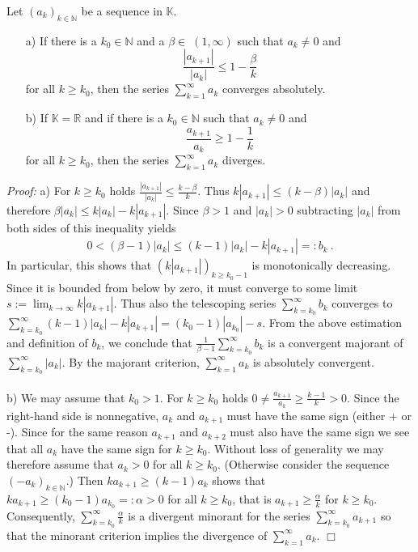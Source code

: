 \begin{Theorem} \label{th:raabecrit}
Let $(a_k)_{k\in\mathbb{N}}$ be  a sequence in $\mathbb{K}$.
\begin{itemize}
 \item[a)] If there is a $k_0\in\mathbb{N}$ and a $\beta\in\;(1,\infty)$ such that $a_k\neq 0$ and 
          $$\frac{|a_{k+1}|}{|a_k|} \leq 1-\frac{\beta}{k}$$ for all $k\geq k_0$, 
          then the series $\sum_{k=1}^{\infty}a_k$ converges absolutely.
 \item[b)] If $\mathbb{K}=\mathbb{R}$ and if there is a $k_0\in\mathbb{N}$ such that $a_k\neq 0$ and 
           $$\frac{a_{k+1}}{a_k} \geq 1-\frac{1}{k}$$ for all $k\geq k_0$, 
           then the series $\sum_{k=1}^{\infty}a_k$ diverges.
\end{itemize}
\end{Theorem}
{\em Proof:}
  a) For $k\geq k_0$ holds $\frac{|a_{k+1}|}{|a_k|} \leq \frac{k-\beta}{k}$. Thus 
     $k|a_{k+1}|\leq (k-\beta)|a_k|$ and therefore $\beta|a_k|\leq k |a_k|-k|a_{k+1}|$. 
     Since $\beta>1$ and $|a_k|>0$ subtracting $|a_k|$ from both sides of this inequality yields
     \begin{eqnarray}\label{l1:raabecrit}
	0<(\beta-1)|a_k|\leq (k-1) |a_k|-k|a_{k+1}|=:b_k \ .
     \end{eqnarray}
     In particular, this shows that $(k|a_{k+1}|)_{k\geq k_0-1}$ is monotonically decreasing. 
     Since it is bounded from below by zero, it must converge to some limit $s:=\lim_{k\rightarrow \infty}k|a_{k+1}|$. 
     Thus also the telescoping series $\sum_{k=k_0}^\infty b_k$ converges to  
     $\sum_{k=k_0}^\infty (k-1) |a_k|-k|a_{k+1}| = (k_0-1)|a_{k_0}|-s$.
     From the above estimation and definition of $b_k$, we conclude that $\frac{1}{\beta-1}\sum_{k=k_0}^\infty b_k$ is a convergent majorant
     of $\sum_{k=k_0}^\infty |a_k|$. By the majorant criterion, $\sum_{k=1}^\infty a_k$ is absolutely convergent.
\\ \\
  b) We may assume that $k_0>1$. For $k\geq k_0$ holds $0\neq\frac{a_{k+1}}{a_k} \geq \frac{k-1}{k}>0$. Since the right-hand side is nonnegative,
     $a_{k}$ and $a_{k+1}$ must have the same sign (either + or -). Since for the same reason $a_{k+1}$ and $a_{k+2}$
     must also have the same sign we see that all $a_k$ have the same sign for $k\geq k_0$. Without loss of generality
     we may therefore assume that $a_k>0$ for all $k\geq k_0$. (Otherwise consider the sequence $(-a_k)_{k\in\mathbb{N}}$.)
     Then $ka_{k+1}\geq (k-1)a_k$ shows that $ka_{k+1}\geq (k_0-1)a_{k_0}=:\alpha >0$ for all $k\geq k_0$, that is 
     $a_{k+1}\geq \frac{\alpha}{k}$ for $k\geq k_0$.  
     Consequently, $\sum_{k=k_0}^{\infty}\frac{\alpha}{k}$ is a divergent minorant for the series $\sum_{k=k_0}^{\infty}a_{k+1}$ 
     so that the minorant criterion implies the divergence of $\sum_{k=1}^{\infty}a_k$.
$\Box$

